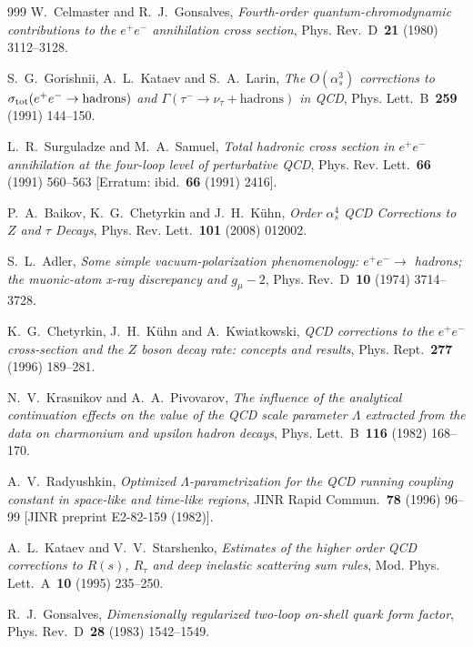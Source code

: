 \begin{thebibliography}{999}
W.~Celmaster and R.~J.~Gonsalves, \emph{Fourth-order quantum-chromodynamic contributions to the $e^+e^-$ annihilation cross section}, Phys. Rev.~D~\textbf{21} (1980) \mbox{3112--3128}.

S.~G.~Gorishnii, A.~L.~Kataev and S.~A.~Larin, \emph{The $O(\alpha_s^3)$ corrections to $\sigma_{\rm tot}(e^+e^-\to\text{hadrons})$ and $\Gamma(\tau^-\to\nu_\tau+\text{hadrons})$ in QCD}, Phys. Lett.~B~\textbf{259} (1991) \mbox{144--150}.

L.~R.~Surguladze and M.~A.~Samuel, \emph{Total hadronic cross section in $e^+e^-$ annihilation at the four-loop level of perturbative QCD}, Phys. Rev. Lett.~\textbf{66} (1991) \mbox{560--563} [Erratum: ibid.~\textbf{66} (1991) \mbox{2416}].

P.~A.~Baikov, K.~G.~Chetyrkin and J.~H.~K\"uhn, \emph{Order $\alpha_s^4$ QCD Corrections to $Z$ and $\tau$ Decays}, Phys. Rev. Lett.~\textbf{101} (2008) \mbox{012002}.

S.~L.~Adler, \emph{Some simple vacuum-polarization phenomenology: $e^+e^-\to$ hadrons; the muonic-atom x-ray discrepancy and $g_\mu-2$}, Phys. Rev.~D~\textbf{10} (1974) \mbox{3714--3728}.

K.~G.~Chetyrkin, J.~H.~K\"uhn and A.~Kwiatkowski, \emph{QCD corrections to the $e^+e^-$ cross-section and the $Z$ boson decay rate: concepts and results}, Phys. Rept.~\textbf{277} (1996) \mbox{189--281}.

N.~V.~Krasnikov and A.~A.~Pivovarov, \emph{The influence of the analytical continuation effects on the value of the QCD scale parameter $\Lambda$ extracted from the data on charmonium and upsilon hadron decays}, Phys. Lett.~B~\textbf{116} (1982) \mbox{168--170}.

A.~V.~Radyushkin, \emph{Optimized $\Lambda$-parametrization for the QCD running coupling constant in space-like and time-like regions}, JINR Rapid Commun.~\textbf{78} (1996) \mbox{96--99} [JINR preprint E2-82-159 (1982)].

A.~L.~Kataev and V.~V.~Starshenko, \emph{Estimates of the higher order QCD corrections to $R(s)$, $R_\tau$ and deep inelastic scattering sum rules}, Mod. Phys. Lett.~A~\textbf{10} (1995) \mbox{235--250}.

R.~J.~Gonsalves, \emph{Dimensionally regularized two-loop on-shell quark form factor}, Phys. Rev.~D~\textbf{28} (1983) \mbox{1542--1549}.


\end{thebibliography}
